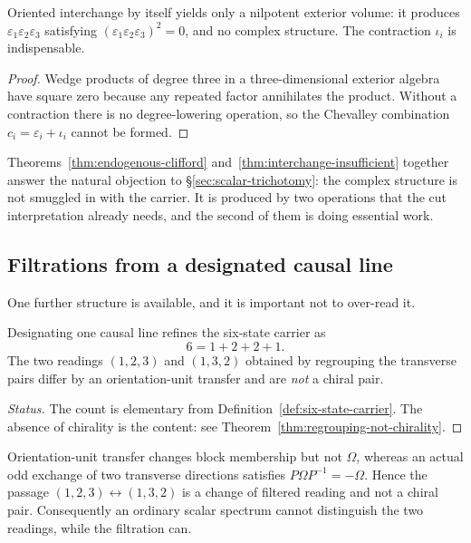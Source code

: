 \begin{theorem}\label{thm:interchange-insufficient}
Oriented interchange by itself yields only a nilpotent exterior volume: it produces
$\varepsilon_1\varepsilon_2\varepsilon_3$ satisfying
$(\varepsilon_1\varepsilon_2\varepsilon_3)^{2}=0$, and no complex structure.  The
contraction $\iota_i$ is indispensable.
\end{theorem}

\begin{proof}
Wedge products of degree three in a three-dimensional exterior algebra have square
zero because any repeated factor annihilates the product.  Without a contraction
there is no degree-lowering operation, so the Chevalley combination $c_i=\varepsilon_i
+\iota_i$ cannot be formed.
\end{proof}

\begin{remark}
Theorems~\ref{thm:endogenous-clifford} and~\ref{thm:interchange-insufficient}
together answer the natural objection to \S\ref{sec:scalar-trichotomy}: the complex
structure is not smuggled in with the carrier.  It is produced by two operations that
the cut interpretation already needs, and the second of them is doing essential work.
\end{remark}

\subsection{Filtrations from a designated causal line}

One further structure is available, and it is important not to over-read it.

\begin{proposition}\label{prop:filtration}
Designating one causal line refines the six-state carrier as
\[
  6=1+2+2+1 .
\]
The two readings $(1,2,3)$ and $(1,3,2)$ obtained by regrouping the transverse pairs
differ by an orientation-unit transfer and are \emph{not} a chiral pair.
\end{proposition}

\begin{proof}[Status]
The count is elementary from
Definition~\ref{def:six-state-carrier}.  The absence of chirality is the content: see
Theorem~\ref{thm:regrouping-not-chirality}.
\end{proof}

\begin{theorem}\label{thm:regrouping-not-chirality}
Orientation-unit transfer changes block membership but not $\Omega$, whereas an actual
odd exchange of two transverse directions satisfies $P\Omega P^{-1}=-\Omega$.  Hence
the passage $(1,2,3)\leftrightarrow(1,3,2)$ is a change of filtered reading and not a
chiral pair.  Consequently an ordinary scalar spectrum cannot distinguish the two
readings, while the filtration can.
\end{theorem}

